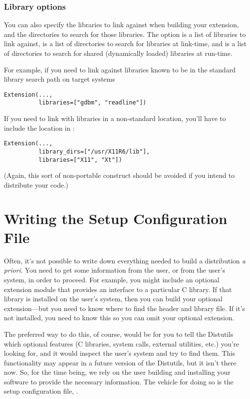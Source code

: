 \documentclass{howto}
\begin{document}
\subsubsection{Library options}

You can also specify the libraries to link against when building your
extension, and the directories to search for those libraries.  The
 option is a list of libraries to link against,
 is a list of directories to search for libraries at 
link-time, and  is a list of directories to 
search for shared (dynamically loaded) libraries at run-time.

For example, if you need to link against libraries known to be in the
standard library search path on target systems
\begin{verbatim}
Extension(...,
          libraries=["gdbm", "readline"])
\end{verbatim}

If you need to link with libraries in a non-standard location, you'll
have to include the location in :
\begin{verbatim}
Extension(...,
          library_dirs=["/usr/X11R6/lib"],
          libraries=["X11", "Xt"])
\end{verbatim}
(Again, this sort of non-portable construct should be avoided if you
intend to distribute your code.)



\section{Writing the Setup Configuration File}
\label{setup-config}

Often, it's not possible to write down everything needed to build a
distribution \emph{a priori}.  You need to get some information from the
user, or from the user's system, in order to proceed.  For example, you
might include an optional extension module that provides an interface to
a particular C library.  If that library is installed on the user's
system, then you can build your optional extension---but you need to
know where to find the header and library file.  If it's not installed,
you need to know this so you can omit your optional extension.

The preferred way to do this, of course, would be for you to tell the
Distutils which optional features (C libraries, system calls, external
utilities, etc.) you're looking for, and it would inspect the user's
system and try to find them.  This functionality may appear in a future
version of the Distutils, but it isn't there now.  So, for the time
being, we rely on the user building and installing your software to
provide the necessary information.  The vehicle for doing so is the
setup configuration file, .
\end{document}

